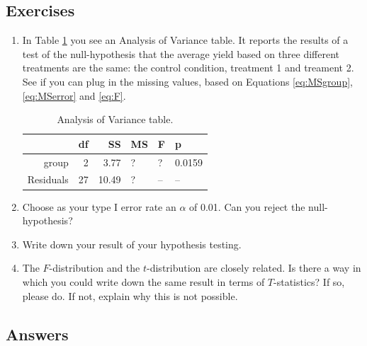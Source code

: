 \documentclass[]{report}\usepackage[]{graphicx}\usepackage[]{color}
\begin{document}
\subsection{Exercises}


\begin{enumerate}



\item In Table \ref{tab:anova_1} you see an Analysis of Variance table. It reports the results of a test of the null-hypothesis that the average yield based on three different treatments are the same: the control condition, treatment 1 and treament 2. See if you can plug in the missing values, based on Equations \ref{eq:MSgroup},\ref{eq:MSerror} and \ref{eq:F}.

\begin{table}[ht]
\centering
\caption{Analysis of Variance table.} 
\label{tab:anova_1}
\begin{tabular}{rrrlll}
  \hline
 & df & SS & MS & F & p \\ 
  \hline
group &   2 & 3.77 & ? & ? & 0.0159 \\ 
  Residuals &  27 & 10.49 & ? & -- & -- \\ 
   \hline
\end{tabular}
\end{table}


\item Choose as your type I error rate an $\alpha$ of 0.01. Can you reject the null-hypothesis? 

\item Write down your result of your hypothesis testing. 

\item The $F$-distribution and the $t$-distribution are closely related. Is there a way in which you could write down the same result in terms of $T$-statistics? If so, please do. If not, explain why this is not possible. 

\end{enumerate}

\subsection{Answers}
\end{document}
